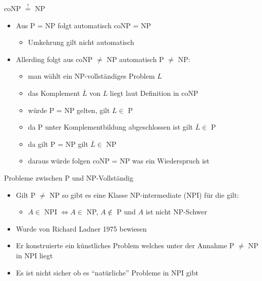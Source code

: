 \documentclass[ignorenonframetext,]{beamer}
\begin{document}
\begin{frame}{coNP $\stackrel{?}{=}$ NP}

\begin{itemize}
\itemsep1pt\parskip0pt
\item
  Aus P = NP folgt automatisch coNP = NP

  \begin{itemize}
  \itemsep1pt\parskip0pt
  \item
    Umkehrung gilt nicht automatisch
  \end{itemize}
\item
  Allerding folgt aus coNP $\neq$ NP automatisch P $\neq$ NP:

  \begin{itemize}
  \itemsep1pt\parskip0pt
  \item
    man wählt ein NP-vollständiges Problem $L$
  \item
    das Komplement $\overline{L}$ von $L$ liegt laut Definition in coNP
  \item
    würde P = NP gelten, gilt $L \in$ P
  \item
    da P unter Komplementbildung abgeschlossen ist gilt
    $\overline{L} \in$ P
  \item
    da gilt P = NP gilt $\overline{L} \in$ NP
  \item
    daraus würde folgen coNP = NP was ein Wiederspruch ist
  \end{itemize}
\end{itemize}

\end{frame}

\begin{frame}{Probleme zwischen P und NP-Vollständig}

\begin{itemize}
\itemsep1pt\parskip0pt
\item
  Gilt P $\neq$ NP so gibt es eine Klasse NP-intermediate (NPI) für die
  gilt:

  \begin{itemize}
  \itemsep1pt\parskip0pt
  \item
    $A \in$ NPI $\Leftrightarrow A \in$ NP, $A \notin$ P und $A$ ist
    nicht NP-Schwer
  \end{itemize}
\item
  Wurde von Richard Ladner 1975 bewiesen
\item
  Er konstruierte ein künstliches Problem welches unter der Annahme P
  $\neq$ NP in NPI liegt
\item
  Es ist nicht sicher ob es ``natürliche'' Probleme in NPI gibt
\end{itemize}

\end{frame}
\end{document}
